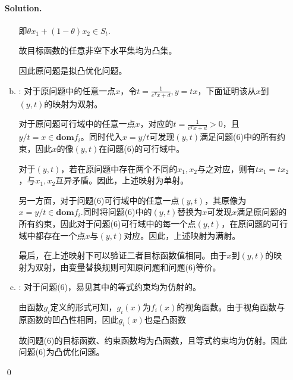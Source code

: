 \documentclass[a4paper]{article}
\newenvironment{solution}
{\color{blue} \paragraph{Solution.}}
{\newline \qed}
\begin{document}
\begin{enumerate}[a)]
\begin{solution}
\begin{enumerate}[a)]
                即$\theta x_1+(1-\theta)x_2\in S_t$.

                故目标函数的任意非空下水平集均为凸集。

                因此原问题是拟凸优化问题。

        \item : 对于原问题中的任意一点$x$，令$t=\frac{1}{c^Tx+d},y=tx$，下面证明该从$x$到$(y, t)$的映射为双射。
        
                对于原问题可行域中的任意一点$x$，对应的$t=\frac{1}{c^Tx+d}>0$，且$y/t=x\in \mathbf{dom} f_i$。同时代入$x=y/t$可发现$(y, t)$满足问题(6)中的所有约束，因此$x$的像$(y, t)$在问题(6)的可行域中。
                
                对于$(y, t)$，若在原问题中存在两个不同的$x_1, x_2$与之对应，则有$tx_1=tx_2$，与$x_1,x_2$互异矛盾。因此，上述映射为单射。

                另一方面，对于问题(6)可行域中的任意一点$(y, t)$，其原像为$x=y/t\in \mathbf{dom}f_i$.同时将问题(6)中的$(y, t)$替换为$x$可发现$x$满足原问题的所有约束，因此对于问题(6)可行域中的每一个点$(y, t)$，在原问题的可行域中都存在一个点$x$与$(y, t)$对应。因此，上述映射为满射。

                最后，在上述映射下可以验证二者目标函数值相同。由于$x$到$(y, t)$的映射为双射，由变量替换规则可知原问题和问题(6)等价。

        \item : 对于问题(6)，易见其中的等式约束均为仿射的。
        
                由函数$g_i$定义的形式可知，$g_i(x)$为$f_i(x)$的视角函数。由于视角函数与原函数的凹凸性相同，因此$g_i(x)$也是凸函数

                故问题(6)的目标函数、约束函数均为凸函数，且等式约束均为仿射。因此问题(6)为凸优化问题。

    \end{enumerate}
\end{solution}
\end{enumerate}
\end{document}
